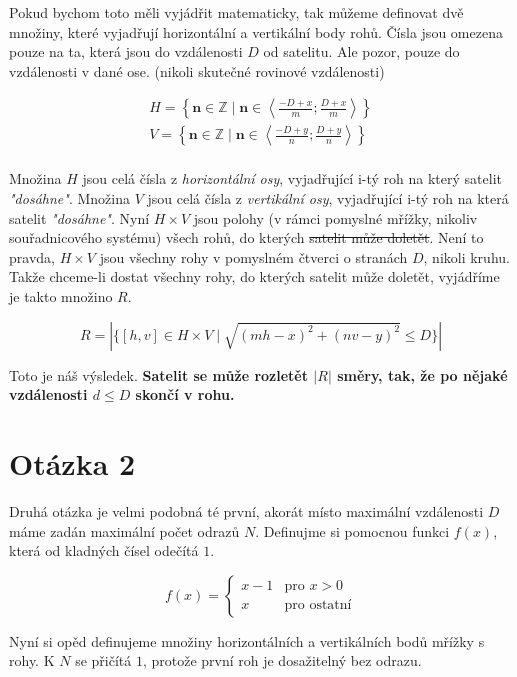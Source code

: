 \documentclass[11pt, a4paper]{article}
\begin{document}
    Pokud bychom toto měli vyjádřit matematicky, tak můžeme definovat dvě množiny, které vyjadřují horizontální a vertikální body rohů.
    Čísla jsou omezena pouze na ta, která jsou do vzdálenosti $D$ od satelitu.
    Ale pozor, pouze do vzdálenosti v dané ose.
    (nikoli skutečné rovinové vzdálenosti)

    \begin{gather*}
        H = \left\{ \mathbf{n} \in \mathbb{Z} \mid \mathbf{n} \in \left\langle \frac{-D+x}{m}; \frac{D+x}{m} \right\rangle \right\}\\
        V = \left\{ \mathbf{n} \in \mathbb{Z} \mid \mathbf{n} \in \left\langle \frac{-D+y}{n}; \frac{D+y}{n} \right\rangle \right\}\\
    \end{gather*}

    Množina $H$ jsou celá čísla z \emph{horizontální osy}, vyjadřující i-tý roh na který satelit \emph{"dosáhne"}.
    Množina $V$ jsou celá čísla z \emph{vertikální osy}, vyjadřující i-tý roh na která satelit \emph{"dosáhne"}.
    Nyní $H \times V$ jsou polohy (v rámci pomyslné mřížky, nikoliv souřadnicového systému) všech rohů, do kterých \sout{satelit může doletět}.
    Není to pravda, $H \times V$ jsou všechny rohy v pomyslném čtverci o stranách $D$, nikoli kruhu.
    Takže chceme-li dostat všechny rohy, do kterých satelit může doletět, vyjádříme je takto množino $R$.

    \[
        R = \left| \{ [h, v] \in H \times V \mid \sqrt{(mh - x)^2+(nv - y)^2} \leq D \} \right|
    \]

    Toto je náš výsledek.
    \textbf{Satelit se může rozletět $|R|$ směry, tak, že po nějaké vzdálenosti $d \leq D$ skončí v rohu.}


    \section{Otázka 2}

    Druhá otázka je velmi podobná té první, akorát místo maximální vzdálenosti $D$ máme zadán maximální počet odrazů $N$.
    Definujme si pomocnou funkci $f(x)$, která od kladných čísel odečítá $1$.

    \[
        f(x) = \begin{cases}
                   x - 1 & \text{pro } x > 0 \\
                   x & \text{pro ostatní}
        \end{cases}
    \]

    Nyní si opěd definujeme množiny horizontálních a vertikálních bodů mřížky s rohy.
    K $N$ se přičítá $1$, protože první roh je dosažitelný bez odrazu.
\end{document}
